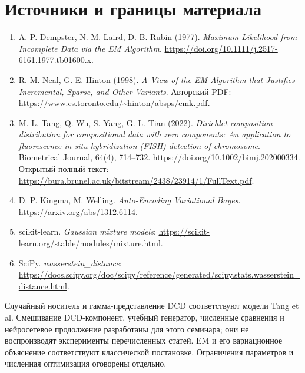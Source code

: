 \documentclass[11pt,a4paper]{article}
\begin{document}
\clearpage
\section*{Источники и границы материала}
\begin{enumerate}
\item A. P. Dempster, N. M. Laird, D. B. Rubin (1977).
\emph{Maximum Likelihood from Incomplete Data via the EM Algorithm}.
\url{https://doi.org/10.1111/j.2517-6161.1977.tb01600.x}.
\item R. M. Neal, G. E. Hinton (1998).
\emph{A View of the EM Algorithm that Justifies Incremental, Sparse,
and Other Variants}. Авторский PDF:
\url{https://www.cs.toronto.edu/~hinton/absps/emk.pdf}.
\item M.-L. Tang, Q. Wu, S. Yang, G.-L. Tian (2022).
\emph{Dirichlet composition distribution for compositional data with zero
components: An application to fluorescence in situ hybridization (FISH)
detection of chromosome}. Biometrical Journal, 64(4), 714--732.
\url{https://doi.org/10.1002/bimj.202000334}.
Открытый полный текст:
\url{https://bura.brunel.ac.uk/bitstream/2438/23914/1/FullText.pdf}.
\item D. P. Kingma, M. Welling. \emph{Auto-Encoding Variational Bayes}.
\url{https://arxiv.org/abs/1312.6114}.
\item scikit-learn. \emph{Gaussian mixture models}:
\url{https://scikit-learn.org/stable/modules/mixture.html}.
\item SciPy. \emph{wasserstein\_distance}:
\url{https://docs.scipy.org/doc/scipy/reference/generated/scipy.stats.wasserstein_distance.html}.
\end{enumerate}
Случайный носитель и гамма-представление DCD соответствуют модели
Tang et al. Смешивание DCD-компонент, учебный генератор, численные
сравнения и нейросетевое продолжение разработаны для этого семинара;
они не воспроизводят эксперименты перечисленных статей.
EM и его вариационное объяснение соответствуют классической постановке.
Ограничения параметров и численная оптимизация оговорены отдельно.
\end{document}
